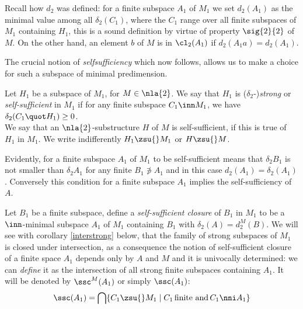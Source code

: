 Recall how $d_{2}$ was defined: for a finite subspace $A_{1}$ of $M_{1}$ we set 
$d_{2}(A_{1})$ as the minimal value among all $\delta_{2}(C_{1})$, where the $C_{1}$ range over
all finite subspaces of $M_{1}$ containing $H_{1}$,
this is a sound definition by virtue of property $\sig{2}{2}$ of $M$. On the other hand, an element $b$ of $M$
is in $\cl_{2}(A_{1})$ if $d_{2}(A_{1}a)=d_{2}(A_{1})$.

The crucial notion of {\em selfsufficiency} which now follows,
allows us to make a choice for such a subspace of minimal predimension.
\begin{dfn}
Let $H_{1}$ be a subspace of $M_{1}$, for $M\in\nla{2}$.
We say that $H_{1}$ is ($\delta_{2}$-)\emph{strong} or 
\emph{self-sufficient} in $M_{1}$ if
for any finite subspace $C_{1}\inn M_{1}$, we have $\delta_{2}(C_{1}\quot H_{1})\geq0$.\\
We say that an $\nla{2}$-substructure $H$ of $M$ is self-sufficient, if this is true of $H_{1}$ in $M_{1}$. We write
indifferently $H_{1}\zsu{}M_{1}$ or $H\zsu{}M$. 
\end{dfn}
Evidently, for a finite subspace $A_{1}$
of $M_{1}$ to be self-sufficient means that
$\delta_{2}B_{1}$ is not smaller than $\delta_{2}A_{1}$ for any finite $B_{1}\nni A_{1}$ and in this case
$d_{2}(A_{1})=\delta_{2}(A_{1})$. Conversely this condition for a finite subspace $A_{1}$ implies the
self-sufficiency of $A$.

\smallskip
Let $B_{1}$ be a finite subspace, define a \emph{self-sufficient closure} of $B_{1}$ in $M_{1}$ to be a 
$\inn$-minimal subspace $A_{1}$ of $M_{1}$ containing $B_{1}$ with $\delta_{2}(A)=d_{2}^{M}(B)$.
%
We will see with corollary \ref{interstrong} below, that the family of strong subspaces of $M_{1}$ is closed under
intersection, as a consequence the notion of self-sufficient closure of a finite space $A_{1}$ depends only
by $A$ and $M$ and it is univocally determined: we can {\em define} it as the intersection
of all strong finite subspaces containing $A_{1}$. It will be denoted by $\ssc^{M}(A_{1})$ or simply $\ssc(A_{1})$:
$$\ssc(A_{1})=\bigcap\{C_{1}\zsu{}M_{1}\mid C_{1}\, \text{finite and}\, C_{1}\nni A_{1} \}$$

